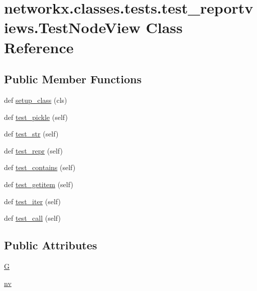 \hypertarget{classnetworkx_1_1classes_1_1tests_1_1test__reportviews_1_1TestNodeView}{}\section{networkx.\+classes.\+tests.\+test\+\_\+reportviews.\+Test\+Node\+View Class Reference}
\label{classnetworkx_1_1classes_1_1tests_1_1test__reportviews_1_1TestNodeView}
\subsection*{Public Member Functions}
\begin{DoxyCompactItemize}
\item 
def \hyperlink{classnetworkx_1_1classes_1_1tests_1_1test__reportviews_1_1TestNodeView_a17355f20f0f90049bf2a51436bcea30a}{setup\+\_\+class} (cls)
\item 
def \hyperlink{classnetworkx_1_1classes_1_1tests_1_1test__reportviews_1_1TestNodeView_a08afe28058b853d02eefdc0f4fec7a3f}{test\+\_\+pickle} (self)
\item 
def \hyperlink{classnetworkx_1_1classes_1_1tests_1_1test__reportviews_1_1TestNodeView_a7ed49c5ba9ba8244c893b0354e0b35a2}{test\+\_\+str} (self)
\item 
def \hyperlink{classnetworkx_1_1classes_1_1tests_1_1test__reportviews_1_1TestNodeView_aaafb6d9fbab70813e7b7f0a6cefb0eba}{test\+\_\+repr} (self)
\item 
def \hyperlink{classnetworkx_1_1classes_1_1tests_1_1test__reportviews_1_1TestNodeView_affda2b2e0a08cd5b6d9775827f9f592e}{test\+\_\+contains} (self)
\item 
def \hyperlink{classnetworkx_1_1classes_1_1tests_1_1test__reportviews_1_1TestNodeView_a547ba9a28ef93fdf296a037e83453bc0}{test\+\_\+getitem} (self)
\item 
def \hyperlink{classnetworkx_1_1classes_1_1tests_1_1test__reportviews_1_1TestNodeView_a9011ab59adafd1638d4ac527bd1ce55a}{test\+\_\+iter} (self)
\item 
def \hyperlink{classnetworkx_1_1classes_1_1tests_1_1test__reportviews_1_1TestNodeView_a9354f15e652cbf92d9fd5deecc62abfb}{test\+\_\+call} (self)
\end{DoxyCompactItemize}
\subsection*{Public Attributes}
\begin{DoxyCompactItemize}
\item 
\hyperlink{classnetworkx_1_1classes_1_1tests_1_1test__reportviews_1_1TestNodeView_adfebcb53ef19fe1261b1dad64ee01783}{G}
\item 
\hyperlink{classnetworkx_1_1classes_1_1tests_1_1test__reportviews_1_1TestNodeView_aa83d5a40861a2b147e742b4be090dbc9}{nv}
\end{DoxyCompactItemize}


